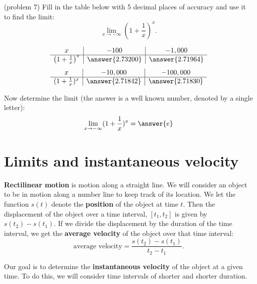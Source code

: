 \documentclass[handout]{ximera}
\begin{document}
\begin{problem}(problem 7)
Fill in the table below with 5 decimal places of accuracy and use it to find the limit:
\[\lim_{x \to -\infty} \left(1+\frac{1}{x}\right)^x.\]

\begin{center}
\[
\begin{array}{ c | c | c }
  x & -100 & -1,000   \\ 
	\hline 
	 \left(1+\frac{1}{x}\right)^x & \answer{2.73200} & \answer{2.71964} 
\end{array}
\]
\[
\begin{array}{ c | c | c  }
  x  & -10,000 & -100,000 \\ 
	\hline 
	 (1+\frac{1}{x})^x  & \answer{2.71842} & \answer{2.71830}
\end{array}
\]
\end{center}
Now determine the limit (the answer is a well known number, denoted by a single letter):
\[
\lim_{x \to -\infty} (1+\frac{1}{x})^x = \answer{e}
\]
\end{problem}



\section{Limits and instantaneous velocity}


\textbf{Rectilinear motion} is motion along a straight line. We will consider an object to be in motion along a number line to keep track of its location.
We let the function $s(t)$ denote the \textbf{position} of the object at time $t$. Then the displacement of the object over a time interval,
$[t_1, t_2]$ is given by $s(t_2) - s(t_1)$.  If we divide the displacement by the duration of the time interval, we get the 
\textbf{average velocity} of the object over that time interval:
\[
\text{average velocity} = \frac{s(t_2) - s(t_1)}{t_2 -t_1}.
\]


Our goal is to determine the \textbf{instantaneous velocity} of the 
object at a given time.  To do this, we will consider time intervals of shorter and shorter duration.
\end{document}

